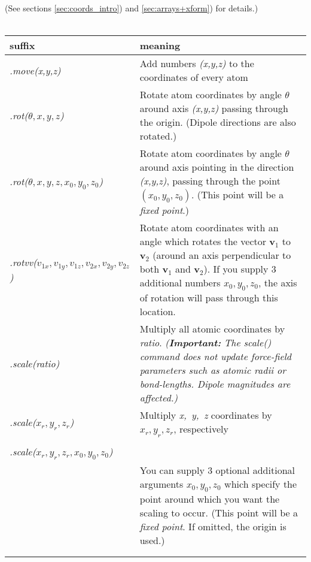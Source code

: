 \documentclass[11pt]{article}
\begin{document}
(See sections \ref{sec:coords_intro}) and \ref{sec:arrays+xform}) for details.)
\\
\\
\begin{longtable}[h]{l|p{10cm}}
\textbf{suffix} & \textbf{meaning}
\\
\hline
\hline
\textit{.move(x,y,z)} & 
 Add numbers \mbox{\textit{(x,y,z)}} to the coordinates of every atom
\\
\hline
 \textit{.rot($\theta,x,y,z$)} &
 Rotate atom coordinates 
 by angle $\theta$ around axis \mbox{\textit{(x,y,z)}}
 passing through the origin. 
 (Dipole directions are also rotated.)
\\
\hline
\textit{.rot($\theta,x,y,z,x_0,y_0,z_0$)} &
 Rotate atom coordinates
 by angle $\theta$ around axis pointing in the direction 
 \mbox{\textit{(x,y,z)}},
 passing through the point \mbox{$(x_0,y_0,z_0)$}. 
 (This point will be a \textit{fixed point}.)
\\
\hline
 \textit{.rotvv($v_{1x},v_{1y},v_{1z},v_{2x},v_{2y},v_{2z}$)} &
 Rotate atom coordinates 
 with an angle which rotates the vector $\mathbf{v}_1$ to $\mathbf{v}_2$
 (around an axis perpendicular to both $\mathbf{v}_1$ and $\mathbf{v}_2$).
 If you supply 3 additional numbers $x_0,y_0,z_0$, the axis of rotation
 will pass through this location.
\\
\hline
\textit{.scale(ratio)}    & 
Multiply all atomic coordinates by \textit{ratio}.
\textit{(\textbf{Important:} The scale() command does not update force-field 
parameters such as atomic radii or bond-lengths. Dipole magnitudes are affected.)}
\\
\hline
\textit{.scale($x_r,y_r,z_r$)} & 
Multiply \mbox{\textit{x, y, z}} coordinates by 
\mbox{$x_r, y_r, z_r$}, respectively
\\
\hline
\begin{tabular}[t]{l}
\textit{.scale(ratio,$x_0,y_0,z_0$)} \ or \\
\textit{.scale($x_r,y_r,z_r,x_0,y_0,z_0$)} \\
\end{tabular}
&
You can supply 3 optional additional arguments 
\mbox{$x_0,y_0,z_0$} which specify the point around which
you want the scaling to occur.
(This point will be a \textit{fixed point}.
 If omitted, the origin is used.)
\\
\hline
\begin{tabular}[t]{l}
  \textit{.quat($a,b,c,d$)} \\

\end{tabular}
\end{longtable}
\end{document}
